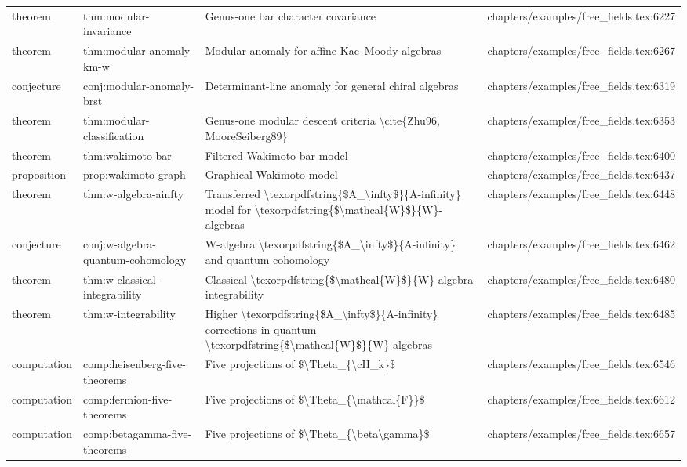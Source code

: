 \documentclass[11pt]{article}
\begin{document}
\begin{longtable}{L{0.10\textwidth}L{0.26\textwidth}L{0.42\textwidth}L{0.22\textwidth}}
theorem & thm:modular-invariance & Genus-one bar character covariance & chapters/examples/free\_fields.tex:6227\\
theorem & thm:modular-anomaly-km-w & Modular anomaly for affine Kac--Moody algebras & chapters/examples/free\_fields.tex:6267\\
conjecture & conj:modular-anomaly-brst & Determinant-line anomaly for general chiral algebras & chapters/examples/free\_fields.tex:6319\\
theorem & thm:modular-classification & Genus-one modular descent criteria \textbackslash{}cite\{Zhu96, MooreSeiberg89\} & chapters/examples/free\_fields.tex:6353\\
theorem & thm:wakimoto-bar & Filtered Wakimoto bar model & chapters/examples/free\_fields.tex:6400\\
proposition & prop:wakimoto-graph & Graphical Wakimoto model & chapters/examples/free\_fields.tex:6437\\
theorem & thm:w-algebra-ainfty & Transferred \textbackslash{}texorpdfstring\{\$A\_\textbackslash{}infty\$\}\{A-infinity\} model for \textbackslash{}texorpdfstring\{\$\textbackslash{}mathcal\{W\}\$\}\{W\}-algebras & chapters/examples/free\_fields.tex:6448\\
conjecture & conj:w-algebra-quantum-cohomology & W-algebra \textbackslash{}texorpdfstring\{\$A\_\textbackslash{}infty\$\}\{A-infinity\} and quantum cohomology & chapters/examples/free\_fields.tex:6462\\
theorem & thm:w-classical-integrability & Classical \textbackslash{}texorpdfstring\{\$\textbackslash{}mathcal\{W\}\$\}\{W\}-algebra integrability & chapters/examples/free\_fields.tex:6480\\
theorem & thm:w-integrability & Higher \textbackslash{}texorpdfstring\{\$A\_\textbackslash{}infty\$\}\{A-infinity\} corrections in quantum \textbackslash{}texorpdfstring\{\$\textbackslash{}mathcal\{W\}\$\}\{W\}-algebras & chapters/examples/free\_fields.tex:6485\\
computation & comp:heisenberg-five-theorems & Five projections of \$\textbackslash{}Theta\_\{\textbackslash{}cH\_k\}\$ & chapters/examples/free\_fields.tex:6546\\
computation & comp:fermion-five-theorems & Five projections of \$\textbackslash{}Theta\_\{\textbackslash{}mathcal\{F\}\}\$ & chapters/examples/free\_fields.tex:6612\\
computation & comp:betagamma-five-theorems & Five projections of \$\textbackslash{}Theta\_\{\textbackslash{}beta\textbackslash{}gamma\}\$ & chapters/examples/free\_fields.tex:6657\\

\end{longtable}
\end{document}
